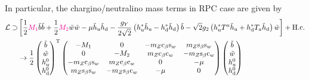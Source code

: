 \documentclass[CheatSheet]{subfiles}
\begin{document}
In particular, the chargino/neutralino mass terms in RPC case are given by
\begin{align}
 \mathcal L\supset
&\left[
  \frac12{\color{magenta}M_1}\tilde b\tilde b
+ \frac12{\color{magenta}M_2}\tilde w\tilde w
- \mu\tilde h_{\mathrm{u}}\tilde h_{\mathrm{d}}
- \frac{g_Y}{2\sqrt2} \left(h_{\mathrm{u}}^*\tilde h_{\mathrm{u}}-h_{\mathrm{d}}^*\tilde h_{\mathrm{d}}\right)\tilde b
- \sqrt{2}{g_2} \left(h_{\mathrm{u}}^*T^a\tilde h_{\mathrm{u}}+h_{\mathrm{d}}^*T_a\tilde h_{\mathrm{d}}\right)\tilde w
\right]+\text{H.c.}
\\
&\to
\frac{1}{2}
\begin{pmatrix}\tilde b \\ \tilde w \\ h_{\mathrm{u}}^0 \\ h_{\mathrm{d}}^0\end{pmatrix}^{\mathrm{T}}
\begin{pmatrix}
 -M_1 & 0 & -m_Z \mathrm{c}_{\beta} \mathrm{s}_{w} & m_Z \mathrm{s}_{\beta} \mathrm{s}_{w} \\
 0 & -M_ 2 & m_Z \mathrm{c}_{\beta} \mathrm{c}_{w} & -m_Z \mathrm{s}_{\beta} \mathrm{c}_{w} \\
 -m_Z \mathrm{c}_{\beta} \mathrm{s}_{w} & m_Z \mathrm{c}_{\beta} \mathrm{c}_{w} & 0 & -\mu  \\
 m_Z \mathrm{s}_{\beta} \mathrm{s}_{w} & -m_Z \mathrm{s}_{\beta} \mathrm{c}_{w} & -\mu  & 0
\end{pmatrix}
\begin{pmatrix}\tilde b \\ \tilde w \\ h_{\mathrm{u}}^0 \\ h_{\mathrm{d}}^0\end{pmatrix}
\end{align}
\end{document}
